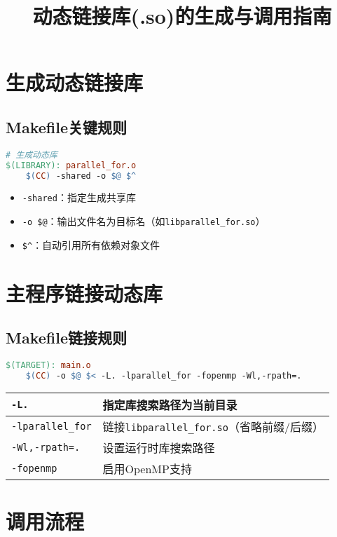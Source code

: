 \documentclass{article}
\begin{document}
\title{动态链接库(.so)的生成与调用指南}
\author{}
\date{}
\maketitle

\section{生成动态链接库}
\subsection{Makefile关键规则}
\begin{lstlisting}[language=make]
# 生成动态库
$(LIBRARY): parallel_for.o
    $(CC) -shared -o $@ $^
\end{lstlisting}

\begin{itemize}
    \item \texttt{-shared}：指定生成共享库
    \item \texttt{-o \$@}：输出文件名为目标名（如\texttt{libparallel\_for.so}）
    \item \texttt{\$^}：自动引用所有依赖对象文件
\end{itemize}

\section{主程序链接动态库}
\subsection{Makefile链接规则}
\begin{lstlisting}[language=make]
$(TARGET): main.o
    $(CC) -o $@ $< -L. -lparallel_for -fopenmp -Wl,-rpath=.
\end{lstlisting}

\begin{tabular}{|l|l|}
\hline
\texttt{-L.} & 指定库搜索路径为当前目录 \\
\hline
\texttt{-lparallel\_for} & 链接\texttt{libparallel\_for.so}（省略前缀/后缀） \\
\hline
\texttt{-Wl,-rpath=.} & 设置运行时库搜索路径 \\
\hline
\texttt{-fopenmp} & 启用OpenMP支持 \\
\hline
\end{tabular}

\section{调用流程}
\end{document}
